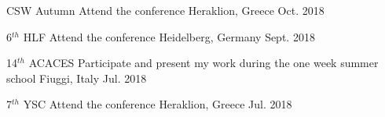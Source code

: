 \begin{cvhonors}
  \cvhonor
    {CSW Autumn} %
    {Attend the conference} %
    {Heraklion, Greece} %
    {Oct. 2018} %

  \cvhonor
    {6$^{th}$ HLF} %
    {Attend the conference} %
    {Heidelberg, Germany} %
    {Sept. 2018} %

  \cvhonor
    {14$^{th}$ ACACES} %
    {Participate and present my work during the one week summer school} %
    {Fiuggi, Italy} %
    {Jul. 2018} %

  \cvhonor
    {7$^{th}$ YSC} %
    {Attend the conference} %
    {Heraklion, Greece} %
    {Jul. 2018} %


\end{cvhonors}
